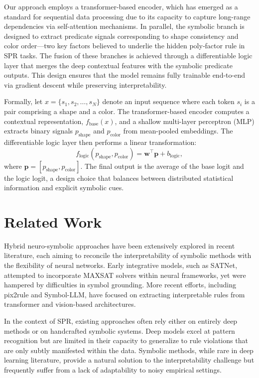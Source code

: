 \documentclass{article}
\begin{document}
Our approach employs a transformer-based encoder, which has emerged as a standard for sequential data processing due to its capacity to capture long-range dependencies via self-attention mechanisms. In parallel, the symbolic branch is designed to extract predicate signals corresponding to shape consistency and color order—two key factors believed to underlie the hidden poly‐factor rule in SPR tasks. The fusion of these branches is achieved through a differentiable logic layer that merges the deep contextual features with the symbolic predicate outputs. This design ensures that the model remains fully trainable end-to-end via gradient descent while preserving interpretability.

Formally, let \( x = \{s_1, s_2, \dots, s_N\} \) denote an input sequence where each token \( s_i \) is a pair comprising a shape and a color. The transformer-based encoder computes a contextual representation, \( f_{\text{base}}(x) \), and a shallow multi-layer perceptron (MLP) extracts binary signals \( p_{\text{shape}} \) and \( p_{\text{color}} \) from mean-pooled embeddings. The differentiable logic layer then performs a linear transformation:
\[
f_{\text{logic}}(p_{\text{shape}}, p_{\text{color}}) = \mathbf{w}^\top \mathbf{p} + b_{\text{logic}},
\]
where \( \mathbf{p} = [p_{\text{shape}}, p_{\text{color}}] \). The final output is the average of the base logit and the logic logit, a design choice that balances between distributed statistical information and explicit symbolic cues.

\section{Related Work}
Hybrid neuro-symbolic approaches have been extensively explored in recent literature, each aiming to reconcile the interpretability of symbolic methods with the flexibility of neural networks. Early integrative models, such as SATNet, attempted to incorporate MAXSAT solvers within neural frameworks, yet were hampered by difficulties in symbol grounding. More recent efforts, including pix2rule and Symbol-LLM, have focused on extracting interpretable rules from transformer and vision-based architectures.

In the context of SPR, existing approaches often rely either on entirely deep methods or on handcrafted symbolic systems. Deep models excel at pattern recognition but are limited in their capacity to generalize to rule violations that are only subtly manifested within the data. Symbolic methods, while rare in deep learning literature, provide a natural solution to the interpretability challenge but frequently suffer from a lack of adaptability to noisy empirical settings.
\end{document}

